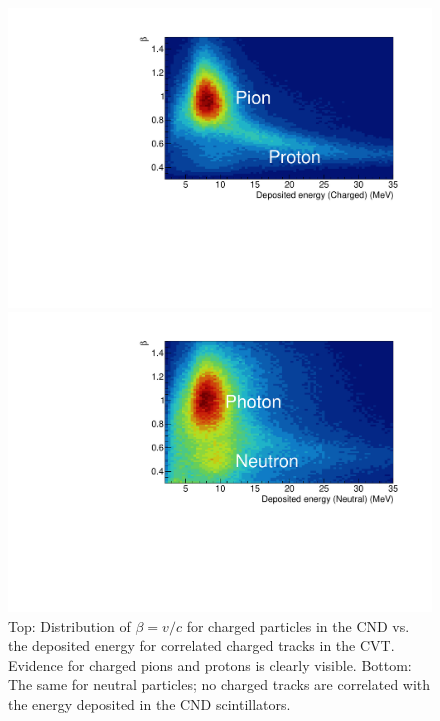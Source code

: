 \documentclass[final,3p]{elsarticle}
\begin{document}
\begin{twocolumn}
\begin{figure}[t!]
\centerline{\includegraphics[width=1.\columnwidth]{CND-BetaE.pdf}}
\centerline{\includegraphics[width=1.\columnwidth]{CND-BetaENeutral.pdf}}
\caption{Top: Distribution of $\beta=v/c$ for charged particles in the CND vs. the deposited energy for correlated
  charged tracks in the CVT. Evidence for charged pions and protons is clearly visible. Bottom: The same for neutral
  particles; no charged tracks are correlated with the energy deposited in the CND scintillators.} 
\label{CND-neutrals}
\end{figure} 


\end{twocolumn}
\end{document}
